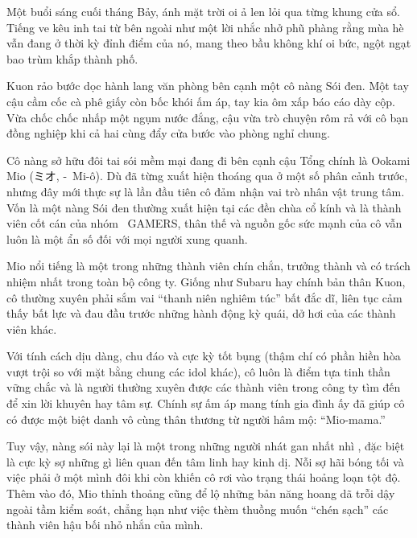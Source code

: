 \documentclass[../main.tex]{subfiles}
\begin{document}
\color{black}

Một buổi sáng cuối tháng Bảy, ánh mặt trời oi ả len lỏi qua từng khung cửa sổ. Tiếng ve kêu inh tai từ bên ngoài như một lời nhắc nhở phũ phàng rằng mùa hè vẫn đang ở thời kỳ đỉnh điểm của nó, mang theo bầu không khí oi bức, ngột ngạt bao trùm khắp thành phố.

Kuon rảo bước dọc hành lang văn phòng bên cạnh một cô nàng Sói đen. Một tay cậu cầm cốc cà phê giấy còn bốc khói ấm áp, tay kia ôm xấp báo cáo dày cộp. Vừa chốc chốc nhấp một ngụm nước đắng, cậu vừa trò chuyện rôm rả với cô bạn đồng nghiệp khi cả hai cùng đẩy cửa bước vào phòng nghỉ chung.

\chrint

Cô nàng sở hữu đôi tai sói mềm mại đang đi bên cạnh cậu Tổng chính là Ookami Mio (ミオ, -\ Mi-ô). Dù đã từng xuất hiện thoáng qua ở một số phân cảnh trước, nhưng đây mới thực sự là lần đầu tiên cô đảm nhận vai trò nhân vật trung tâm. Vốn là một nàng Sói đen thường xuất hiện tại các đền chùa cổ kính và là thành viên cốt cán của nhóm \hll\ GAMERS, thân thế và nguồn gốc sức mạnh của cô vẫn luôn là một ẩn số đối với mọi người xung quanh.

Mio nổi tiếng là một trong những thành viên chín chắn, trưởng thành và có trách nhiệm nhất trong toàn bộ công ty. Giống như Subaru hay chính bản thân Kuon, cô thường xuyên phải sắm vai ``thanh niên nghiêm túc'' bất đắc dĩ, liên tục cảm thấy bất lực và đau đầu trước những hành động kỳ quái, dở hơi của các thành viên khác.


Với tính cách dịu dàng, chu đáo và cực kỳ tốt bụng (thậm chí có phần hiền hòa vượt trội so với mặt bằng chung các idol khác), cô luôn là điểm tựa tinh thần vững chắc và là người thường xuyên được các thành viên trong công ty tìm đến để xin lời khuyên hay tâm sự. Chính sự ấm áp mang tính gia đình ấy đã giúp cô có được một biệt danh vô cùng thân thương từ người hâm mộ: ``Mio-mama.''

Tuy vậy, nàng sói này lại là một trong những người nhát gan nhất nhì \hll, đặc biệt là cực kỳ sợ những gì liên quan đến tâm linh hay kinh dị. Nỗi sợ hãi bóng tối và việc phải ở một mình đôi khi còn khiến cô rơi vào trạng thái hoảng loạn tột độ. Thêm vào đó, Mio thỉnh thoảng cũng để lộ những bản năng hoang dã trỗi dậy ngoài tầm kiểm soát, chẳng hạn như việc thèm thuồng muốn ``chén sạch'' các thành viên hậu bối nhỏ nhắn của mình.
\end{document}
